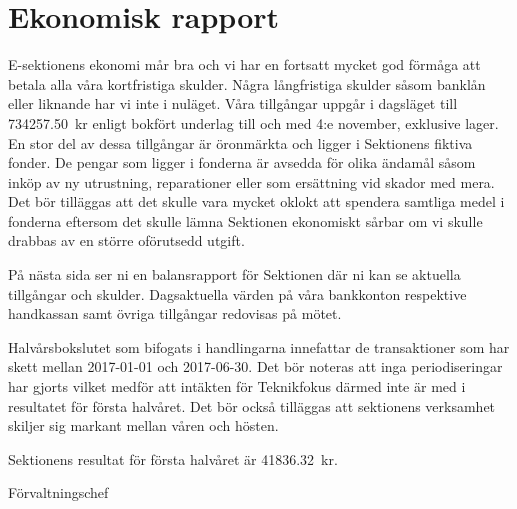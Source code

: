 \documentclass[../_main/handlingar.tex]{subfiles}
\begin{document}
\section{Ekonomisk rapport}
E-sektionens ekonomi mår bra och vi har en fortsatt mycket god förmåga att betala alla våra kortfristiga skulder. Några långfristiga skulder såsom banklån eller liknande har vi inte i nuläget. Våra tillgångar uppgår i dagsläget till \SI{734257.50}{kr} enligt bokfört underlag till och med 4:e november, exklusive lager. En stor del av dessa tillgångar är öronmärkta och ligger i Sektionens fiktiva fonder. De pengar som ligger i fonderna är avsedda för olika ändamål såsom inköp av ny utrustning, reparationer eller som ersättning vid skador med mera. Det bör tilläggas att det skulle vara mycket oklokt att spendera samtliga medel i fonderna eftersom det skulle lämna Sektionen ekonomiskt sårbar om vi skulle drabbas av en större oförutsedd utgift.

På nästa sida ser ni en balansrapport för Sektionen där ni kan se aktuella tillgångar och skulder. Dagsaktuella värden på våra bankkonton respektive handkassan samt övriga tillgångar redovisas på mötet.

Halvårsbokslutet som bifogats i handlingarna innefattar de transaktioner som har skett mellan 2017-01-01 och 2017-06-30. Det bör noteras att inga periodiseringar har gjorts vilket medför att intäkten för Teknikfokus därmed inte är med i resultatet för första halvåret. Det bör också tilläggas att sektionens verksamhet skiljer sig markant mellan våren och hösten.

Sektionens resultat för första halvåret är \SI{41836.32}{kr}.
\begin{signatures}{1}
    \mvh
    \signature{Sophia Grimmeiss Grahm}{Förvaltningschef}
\end{signatures}
\end{document}
